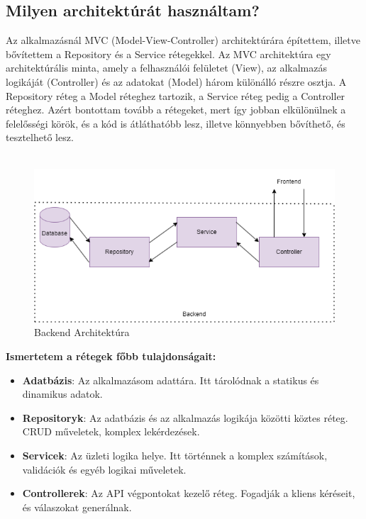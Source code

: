 \subsection*{Milyen architektúrát használtam?}
Az alkalmazásnál MVC (Model-View-Controller) architektúrára építettem, illetve
bővítettem a Repository és a Service rétegekkel. Az MVC architektúra egy
architektúrális minta, amely a felhasználói felületet (View), az alkalmazás
logikáját (Controller) és az adatokat (Model) három különálló részre osztja.
A Repository réteg a Model réteghez tartozik, a Service réteg pedig a Controller réteghez.
Azért bontottam tovább a rétegeket, mert így jobban elkülönülnek a felelősségi körök,
és a kód is átláthatóbb lesz, illetve könnyebben bővíthető, és tesztelhető lesz.
\\
\\
\begin{figure}[H]
    \centering
    \includegraphics[width=14.0truecm]{images/BackendArchitecture.png}
    \caption{Backend Architektúra}
    \label{fig:backend_architecture}
\end{figure}
\textbf{Ismertetem a rétegek főbb tulajdonságait:}
\begin{itemize}
    \item \textbf{Adatbázis}: Az alkalmazásom adattára. Itt tárolódnak a statikus és dinamikus adatok.
    \item \textbf{Repositoryk}: Az adatbázis és az alkalmazás logikája közötti köztes réteg. CRUD műveletek, komplex lekérdezések.
    \item \textbf{Servicek}: Az üzleti logika helye. Itt történnek a komplex számítások, validációk és egyéb logikai műveletek.
    \item \textbf{Controllerek}: Az API végpontokat kezelő réteg. Fogadják a kliens kéréseit, és válaszokat generálnak.
\end{itemize}

